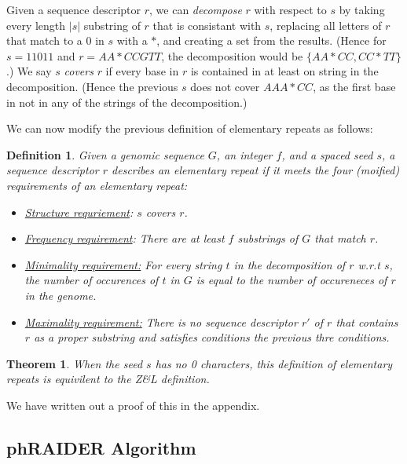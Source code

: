 \documentclass[11pt,letterpaper]{amsart}
\newtheorem{definition}{Definition}
\newtheorem{theorem}{Theorem}
\begin{document}
Given a sequence descriptor $r$, we can {\it decompose} $r$ with
respect to $s$ by taking every length $|s|$ substring of $r$ that is consistant
with $s$, replacing all letters of $r$ that match to a 0 in $s$ with a
$*$, and creating a set from the results.  (Hence for $s = 11011$ and
$r=AA*CCGTT$, the decomposition would be $\{AA*CC, CC*TT\}$.)  We say
$s$ {\it covers} $r$ if every base in $r$ is contained in at least on
string in the decomposition.  (Hence the previous $s$ does not cover $AAA*CC$, as
the first base in not in any of the strings of the decomposition.)


We can now modify the previous definition of elementary repeats as
follows:
\begin{definition} Given a genomic sequence $G$, an integer $f$, and a
  spaced seed $s$, a sequence descriptor $r$ describes an elementary
  repeat if it meets the four (moified) requirements of an elementary repeat:
\begin{itemize}
\item \underline{Structure requriement}: $s$ covers $r$.
\item \underline{Frequency requirement}: There are at least $f$
  substrings of $G$ that match $r$.
\item \underline{Minimality requirement:} For every string $t$ in the
  decomposition of $r$ w.r.t $s$, the number of occurences of $t$ in
  $G$ is equal to the number of occureneces of $r$ in the genome.
\item \underline{Maximality requirement:} There is no sequence
  descriptor $r'$ of $r$ that contains $r$ as a proper substring and
  satisfies conditions the previous thre conditions.
\end{itemize}
\end{definition}

\begin{theorem} When the seed $s$ has no 0 characters, this
    definition of elementary repeats is equivilent to the Z\&L
    definition.
\end{theorem}

We have written out a proof of this in the appendix.

\subsection*{phRAIDER Algorithm}
\end{document}
